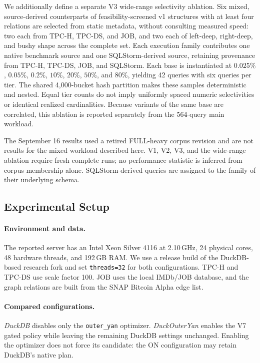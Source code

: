 We additionally define a separate V3 wide-range selectivity ablation. Six
mixed, source-derived counterparts of feasibility-screened v1 structures with
at least four relations are selected from static metadata, without consulting
measured speed: two each from TPC-H, TPC-DS, and JOB, and two each of
left-deep, right-deep, and bushy shape across the complete set. Each execution
family contributes one native benchmark source and one SQLStorm-derived
source, retaining provenance from TPC-H, TPC-DS, JOB, and SQLStorm. Each base is
instantiated at $0.025\%$, $0.05\%$, $0.2\%$, $10\%$, $20\%$, $50\%$, and
$80\%$, yielding 42 queries with six queries per tier.
The shared 4,000-bucket hash partition makes these samples deterministic and
nested. Equal tier counts do not imply uniformly spaced numeric selectivities
or identical realized cardinalities. Because variants of the same base are
correlated, this ablation is reported separately from the 564-query main
workload.

The September 16 results used a retired FULL-heavy corpus revision and are not
results for the mixed workload described here. V1, V2, V3, and the wide-range
ablation require fresh complete runs; no performance statistic is inferred
from corpus membership alone.
SQLStorm-derived queries are assigned to the family of their underlying schema.

\subsection{Experimental Setup}
\label{sec:experimental-setup}

\paragraph{Environment and data.}
The reported server has an Intel Xeon Silver 4116 at 2.10\,GHz, 24 physical
cores, 48 hardware threads, and 192\,GB RAM. We use a release build of the
DuckDB-based research fork and set \texttt{threads=32} for both configurations.
TPC-H and TPC-DS use scale factor 100. JOB uses the local IMDb/JOB database,
and the graph relations are built from the SNAP Bitcoin Alpha edge list.

\paragraph{Compared configurations.}
\emph{DuckDB} disables only the \texttt{outer\_yan} optimizer.
\emph{DuckOuterYan} enables the V7 gated policy while leaving the remaining
DuckDB settings unchanged. Enabling the optimizer does not force its candidate:
the ON configuration may retain DuckDB's native plan.


